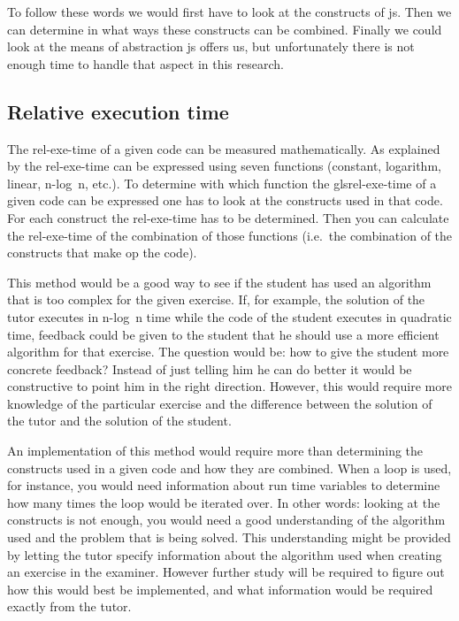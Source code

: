 To follow these words we would first have to look at
the \glspl{construct} of \gls{js}.
Then we can determine in what ways these \glspl{construct} can be combined.
Finally we could look at the means of abstraction \gls{js} offers us,
but unfortunately there is not enough time
to handle that aspect in this research.

\subsection{Relative execution time}

The \gls{rel-exe-time} of a given \gls{code} can be measured mathematically.
As explained by \citet[Chapter 4]{goodrich2008data}
the \gls{rel-exe-time} can be expressed using seven functions
(constant, logarithm, linear, n-log~n, etc.).
To determine with which function
the gls{rel-exe-time} of a given \gls{code} can be expressed
one has to look at the \glspl{construct} used in that \gls{code}.
For each \gls{construct} the \gls{rel-exe-time} has to be determined.
Then you can calculate the \gls{rel-exe-time}
of the combination of those functions
(i.e.\ the combination of the \glspl{construct} that make op the \gls{code}).

This method would be a good way to see
if the \gls{student} has used an algorithm
that is too complex for the given \gls{exercise}.
If, for example, the \gls{solution} of the \gls{tutor} executes in n-log~n time
while the \gls{code} of the \gls{student} executes in quadratic time,
\gls{feedback} could be given to the \gls{student}
that he should use a more efficient algorithm for that \gls{exercise}.
The question would be:
how to give the \gls{student} more concrete \gls{feedback}?
Instead of just telling him he can do better
it would be constructive to point him in the right direction.
However, this would require more knowledge of the particular \gls{exercise}
and the difference between the \gls{solution} of the \gls{tutor}
and the \gls{solution} of the \gls{student}.

An implementation of this method would require more than
determining the \glspl{construct} used in a given \gls{code}
and how they are combined.
When a loop is used, for instance,
you would need information about run time variables
to determine how many times the loop would be iterated over.
In other words: looking at the \glspl{construct} is not enough,
you would need a good understanding of the algorithm used
and the problem that is being solved.
This understanding might be provided
by letting the \gls{tutor} specify information about the algorithm used
when creating an \gls{exercise} in the \gls{examiner}.
However further study will be required to figure out
how this would best be implemented,
and what information would be required exactly from the \gls{tutor}.

